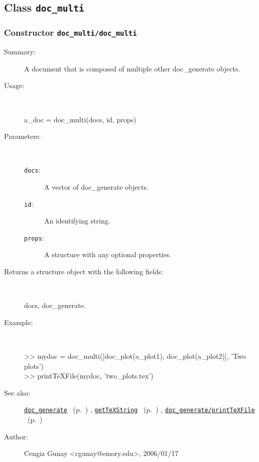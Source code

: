 \subsection{Class \texttt{doc\_multi}}%
%
\label{ref_doc_multi}%
\hypertarget{ref_doc_multi}{}%
\subsubsection[Constructor \texttt{doc\_multi}]{Constructor \texttt{doc\_multi/doc\_multi}}%
%
\label{ref_doc_multi__doc_multi}%
\hypertarget{ref_doc_multi__doc_multi}{}%
\begin{description}
\item[Summary:]A document that is composed of multiple other doc\_generate objects.
%
\item[Usage:]~%
\begin{lyxcode}%
a\_doc = doc\_multi(docs, id, props)
%
\end{lyxcode}%
%
%
\item[Parameters:]~
\begin{description}%
\item[\texttt{docs}:]
 A vector of doc\_generate objects.
\item[\texttt{id}:]
 An identifying string.
\item[\texttt{props}:]
 A structure with any optional properties.
\end{description}%
%
\item[Returns a structure object with the following fields:]~

	docs, doc\_generate.
%
\item[Example:]~
\begin{lyxcode} >> mydoc = doc\_multi([doc\_plot(a\_plot1), doc\_plot(a\_plot2)], 'Two plots')\\%
 >> printTeXFile(mydoc, 'two\_plots.tex')\\%
\end{lyxcode}
%
\item[See also:]%
\hyperlink{ref_doc_generate}{\texttt{doc\_generate}}%
\ (p.~\pageref{ref_doc_generate})%
%
, \hyperlink{ref_getTeXString}{\texttt{getTeXString}}%
\ (p.~\pageref{ref_getTeXString})%
%
, \hyperlink{ref_doc_generate__printTeXFile}{\texttt{doc\_generate/printTeXFile}}%
\ (p.~\pageref{ref_doc_generate__printTeXFile})%
%
%
\item[Author:]%
Cengiz Gunay <cgunay@emory.edu>, 2006/01/17%
\end{description}
\methodline%
